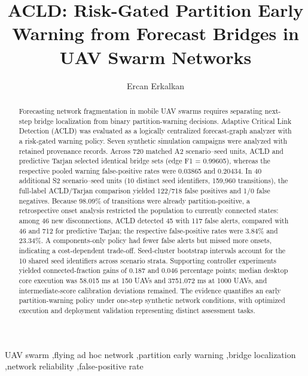 \documentclass[preprint,12pt]{elsarticle}
\theoremstyle{definition}\newtheorem{definition}{Definition}
\theoremstyle{plain}\newtheorem{theorem}{Theorem}
\theoremstyle{plain}\newtheorem{lemma}{Lemma}
\theoremstyle{plain}\newtheorem{corollary}{Corollary}
\theoremstyle{plain}\newtheorem{assumption}{Assumption}
\theoremstyle{remark}\newtheorem{remark}[theorem]{Remark}
\begin{document}
\setlength{\emergencystretch}{3em}
\begin{frontmatter}
\title{ACLD: Risk-Gated Partition Early Warning from Forecast Bridges in UAV Swarm Networks}
\author[aff1]{Ercan Erkalkan}
\begin{abstract}
Forecasting network fragmentation in mobile UAV swarms requires separating next-step bridge localization from binary partition-warning decisions. Adaptive Critical Link Detection (ACLD) was evaluated as a logically centralized forecast-graph analyzer with a risk-gated warning policy. Seven synthetic simulation campaigns were analyzed with retained provenance records. Across 720 matched A2 scenario--seed units, ACLD and predictive Tarjan selected identical bridge sets (edge F1 = 0.99605), whereas the respective pooled warning false-positive rates were 0.03865 and 0.20434. In 40 additional S2 scenario--seed units (10 distinct seed identifiers, 159,960 transitions), the full-label ACLD/Tarjan comparison yielded 122/718 false positives and 1/0 false negatives. Because 98.09\% of transitions were already partition-positive, a retrospective onset analysis restricted the population to currently connected states: among 46 new disconnections, ACLD detected 45 with 117 false alerts, compared with 46 and 712 for predictive Tarjan; the respective false-positive rates were 3.84\% and 23.34\%. A components-only policy had fewer false alerts but missed more onsets, indicating a cost-dependent trade-off. Seed-cluster bootstrap intervals account for the 10 shared seed identifiers across scenario strata. Supporting controller experiments yielded connected-fraction gains of 0.187 and 0.046 percentage points; median desktop core execution was 58.015 ms at 150 UAVs and 3751.072 ms at 1000 UAVs, and intermediate-score calibration deviations remained. The evidence quantifies an early partition-warning policy under one-step synthetic network conditions, with optimized execution and deployment validation representing distinct assessment tasks.
\end{abstract}
\begin{keyword}
UAV swarm \sep flying ad hoc network \sep partition early warning \sep bridge localization \sep network reliability \sep false-positive rate
\end{keyword}
\end{frontmatter}
\end{document}
